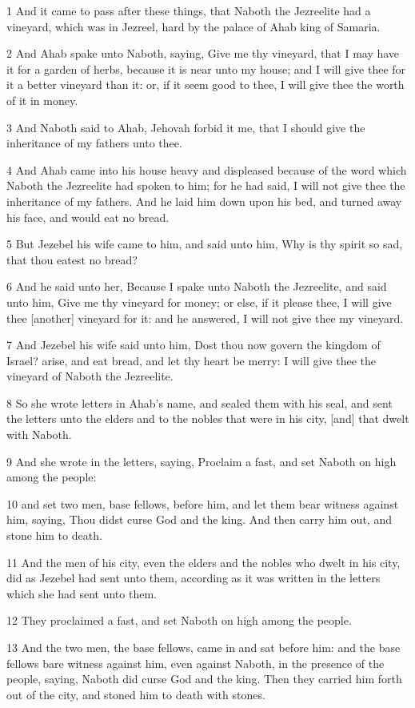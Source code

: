 \par 1 And it came to pass after these things, that Naboth the Jezreelite had a vineyard, which was in Jezreel, hard by the palace of Ahab king of Samaria.
\par 2 And Ahab spake unto Naboth, saying, Give me thy vineyard, that I may have it for a garden of herbs, because it is near unto my house; and I will give thee for it a better vineyard than it: or, if it seem good to thee, I will give thee the worth of it in money.
\par 3 And Naboth said to Ahab, Jehovah forbid it me, that I should give the inheritance of my fathers unto thee.
\par 4 And Ahab came into his house heavy and displeased because of the word which Naboth the Jezreelite had spoken to him; for he had said, I will not give thee the inheritance of my fathers. And he laid him down upon his bed, and turned away his face, and would eat no bread.
\par 5 But Jezebel his wife came to him, and said unto him, Why is thy spirit so sad, that thou eatest no bread?
\par 6 And he said unto her, Because I spake unto Naboth the Jezreelite, and said unto him, Give me thy vineyard for money; or else, if it please thee, I will give thee [another] vineyard for it: and he answered, I will not give thee my vineyard.
\par 7 And Jezebel his wife said unto him, Dost thou now govern the kingdom of Israel? arise, and eat bread, and let thy heart be merry: I will give thee the vineyard of Naboth the Jezreelite.
\par 8 So she wrote letters in Ahab's name, and sealed them with his seal, and sent the letters unto the elders and to the nobles that were in his city, [and] that dwelt with Naboth.
\par 9 And she wrote in the letters, saying, Proclaim a fast, and set Naboth on high among the people:
\par 10 and set two men, base fellows, before him, and let them bear witness against him, saying, Thou didst curse God and the king. And then carry him out, and stone him to death.
\par 11 And the men of his city, even the elders and the nobles who dwelt in his city, did as Jezebel had sent unto them, according as it was written in the letters which she had sent unto them.
\par 12 They proclaimed a fast, and set Naboth on high among the people.
\par 13 And the two men, the base fellows, came in and sat before him: and the base fellows bare witness against him, even against Naboth, in the presence of the people, saying, Naboth did curse God and the king. Then they carried him forth out of the city, and stoned him to death with stones.
